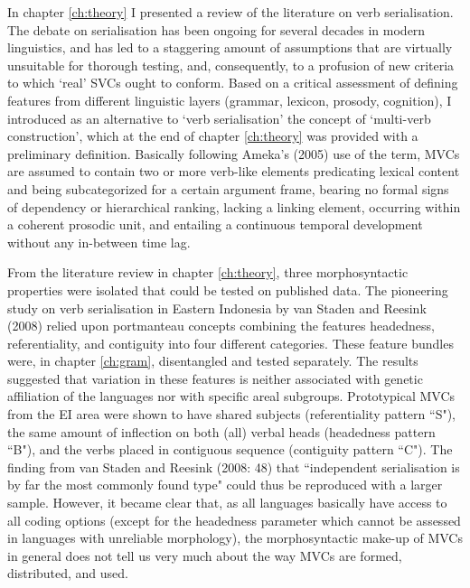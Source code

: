 In chapter \ref{ch:theory} I presented a review of the literature on verb serialisation. The debate on serialisation has been ongoing for several decades in modern linguistics, and has led to a staggering amount of assumptions that are virtually unsuitable for thorough testing, and, consequently, to a profusion of new criteria to which `real' SVCs ought to conform. Based on a critical assessment of defining features from different linguistic layers (grammar, lexicon, prosody, cognition), I introduced as an alternative to `verb serialisation' the concept of `multi-verb construction', which at the end of chapter \ref{ch:theory} was provided with a preliminary definition. Basically following Ameka's (2005) use of the term, MVCs are assumed to contain two or more verb-like elements predicating lexical content and being subcategorized for a certain argument frame, bearing no formal signs of dependency or hierarchical ranking, lacking a linking element, occurring within a coherent prosodic unit, and entailing a continuous temporal development without any in-between time lag. 

From the literature review in chapter \ref{ch:theory}, three morphosyntactic properties were isolated that could be tested on published data. The pioneering study on verb serialisation in Eastern Indonesia by van Staden and Reesink (2008) relied upon portmanteau concepts combining the features headedness, referentiality, and contiguity into four different categories. These feature bundles were, in chapter \ref{ch:gram}, disentangled and tested separately. The results suggested that variation in these features is neither associated with genetic affiliation of the languages nor with specific areal subgroups. Prototypical MVCs from the EI area were shown to have shared subjects (referentiality pattern ``S"), the same amount of inflection on both (all) verbal heads (headedness pattern ``B"), and the verbs placed in contiguous sequence (contiguity pattern ``C"). The finding from van Staden and Reesink (2008: 48) that ``independent serialisation is by far the most commonly found type" could thus be reproduced with a larger sample. However, it became clear that, as all languages basically have access to all coding options (except for the headedness parameter which cannot be assessed in languages with unreliable morphology), the morphosyntactic make-up of MVCs in general does not tell us very much about the way MVCs are formed, distributed, and used.

